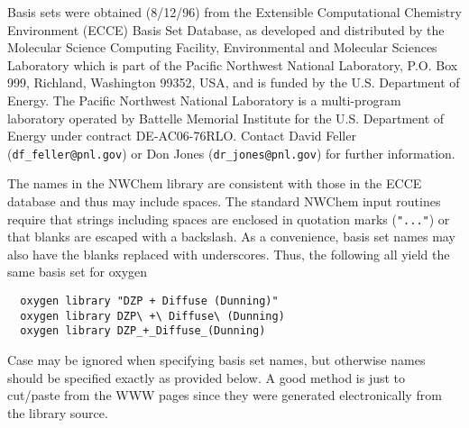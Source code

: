 \label{sec:knownbasis}

Basis sets were obtained (8/12/96) from the Extensible Computational
Chemistry Environment (ECCE) Basis Set Database, as developed and distributed
by the Molecular Science Computing Facility, Environmental and
Molecular Sciences Laboratory which is part of the Pacific Northwest
National Laboratory, P.O. Box 999, Richland, Washington 99352, USA,
and is funded by the U.S. Department of Energy.  The Pacific Northwest
National Laboratory is a multi-program laboratory operated by Battelle
Memorial Institute for the U.S. Department of Energy under contract
DE-AC06-76RLO.  Contact David Feller (\verb+df_feller@pnl.gov+) or Don
Jones (\verb+dr_jones@pnl.gov+) for further information.

The names in the NWChem library are consistent with those in the ECCE
database and thus may include spaces.  The standard NWChem input
routines require that strings including spaces are enclosed in
quotation marks (\verb+"..."+) or that blanks are escaped with a
backslash.  As a convenience, basis set names may also have the blanks
replaced with underscores.  Thus, the following all yield the same
basis set for oxygen
\begin{verbatim}
  oxygen library "DZP + Diffuse (Dunning)"
  oxygen library DZP\ +\ Diffuse\ (Dunning)
  oxygen library DZP_+_Diffuse_(Dunning)
\end{verbatim}

Case may be ignored when specifying basis set names, but otherwise
names should be specified exactly as provided below.  A good method is
just to cut/paste from the WWW pages since they were generated
electronically from the library source.

